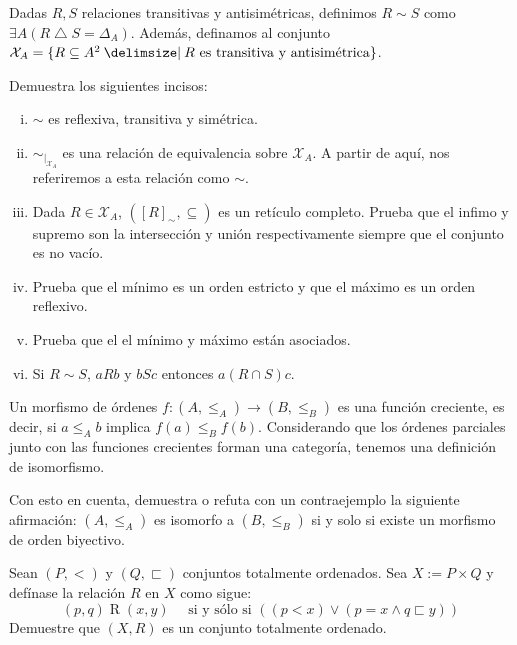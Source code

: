 \begin{exercise}[parzfc=2]
  Dadas $R,S$ relaciones transitivas y antisimétricas, definimos $R\sim S$ como ${\exists A (R\bigtriangleup S = \Delta_A)}$. Además, definamos al conjunto $\mathcal{X}_A=\set{R\subseteq A^2\st R \text{ es transitiva y antisimétrica}}$.
  
  Demuestra los siguientes incisos:
  \begin{enumerate}[i)]
      \item $\sim$ es reflexiva, transitiva y simétrica.
      \item $\sim_{|_{\mathcal{X}_A}}$ es una relación de equivalencia sobre $\mathcal{X}_A$. A partir de aquí, nos referiremos a esta relación como $\sim$.
      \item Dada $R\in \mathcal{X}_A$, $([R]_\sim, \subseteq)$ es un retículo completo. Prueba que el infimo y supremo son la intersección y unión respectivamente siempre que el conjunto es no vacío.
      \item Prueba que el mínimo es un orden estricto y que el máximo es un orden reflexivo.
      \item Prueba que el el mínimo y máximo están asociados.
      \item Si $R\sim S$, $aRb$ y $bSc$ entonces $a(R\cap S) c$.
  \end{enumerate}
  
\end{exercise}

\begin{exercise}
  Un morfismo de órdenes $f\colon (A,\leq_A)\to (B,\leq_B)$ es una función creciente, es decir, si $a\leq_A b$ implica $f(a)\leq_B f(b)$. Considerando que los órdenes parciales junto con las funciones crecientes forman una categoría, tenemos una definición de isomorfismo.

  Con esto en cuenta, demuestra o refuta con un contraejemplo la siguiente afirmación: $(A,\leq_A)$ es isomorfo a $(B,\leq_B)$ si y solo si existe un morfismo de orden biyectivo.
\end{exercise}

\begin{exercise}[parzfc=2]
  Sean $(P,<)$ y $(Q,\sqsubset)$ conjuntos totalmente ordenados. Sea $X:=P \times Q$ y defínase la relación $R$ en $X$ como sigue:
  \[ (p,q) \mathrel{R} (x,y) \quad \text{ si y sólo si } \left( \left( p < x \right) \lor \left( p=x \land q \sqsubset y \right) \right) \]
  Demuestre que $(X,R)$ es un conjunto totalmente ordenado.
\end{exercise}

